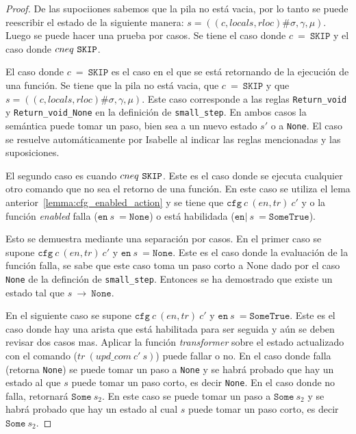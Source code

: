 \begin{proof}
De las supociiones sabemos que la pila no está vacia, por lo tanto se puede reescribir el estado de la siguiente manera: $s = ((c, locals, rloc)\#\sigma,\gamma,\mu)$.
Luego se puede hacer una prueba por casos.
Se tiene el caso donde $c\ =\ \mathtt{SKIP}$ y el caso donde $c\\neq\ \mathtt{SKIP}$.

El caso donde $c\ =\ \mathtt{SKIP}$ es el caso en el que se está retornando de la ejecución de una función.
Se tiene que la pila no está vacia, que $c\ =\ \mathtt{SKIP}$ y que $s = ((c, locals, rloc)\#\sigma,\gamma,\mu)$.
Este caso corresponde a las reglas \verb|Return_void| y \verb|Return_void_None| en la definición de \verb|small_step|.
En ambos casos la semántica puede tomar un paso, bien sea a un nuevo estado $s'$ o a \verb|None|.
El caso se resuelve automáticamente por Isabelle al indicar las reglas mencionadas y las suposiciones.

El segundo caso es cuando $c\\neq\ \mathtt{SKIP}$.
Este es el caso donde se ejecuta cualquier otro comando que no sea el retorno de una función.
En este caso se utiliza el lema anterior~\ref{lemma:cfg_enabled_action} y se tiene que $\mathtt{cfg}\ c\ (en,tr)\ c'$ y o la función \textit{enabled} falla ($\mathtt{en}\ s\ = \mathtt{None}$) o está habilidada ($\mathtt{en}|\ s\ = \mathtt{Some True}$).

Esto se demuestra mediante una separación por casos.
En el primer caso se supone $\mathtt{cfg}\ c\ (en,tr)\ c'$ y $\mathtt{en}\ s\ = \mathtt{None}$.
Este es el caso donde la evaluación de la función falla, se sabe que este caso toma un paso corto a None dado por el caso \verb|None| de la definción de \verb|small_step|.
Entonces se ha demostrado que existe un estado tal que $s\ \rightarrow\ \mathtt{None}$.

En el siguiente caso se supone $\mathtt{cfg}\ c\ (en,tr)\ c'$ y $\mathtt{en}\ s\ = \mathtt{Some True}$.
Este es el caso donde hay una arista que está habilitada para ser seguida y aún se deben revisar dos casos mas.
Aplicar la función \textit{transformer} sobre el estado actualizado con el comando ($tr\ (upd\_com\ c'\ s)$) puede fallar o no.
En el caso donde falla (retorna \verb|None|) se puede tomar un paso a \verb|None| y se habrá probado que hay un estado al que $s$ puede tomar un paso corto, es decir \verb|None|.
En el caso donde no falla, retornará $\mathtt{Some}\ s_{2}$.
En este caso se puede tomar un paso a $\mathtt{Some}\ s_{2}$ y se habrá probado que hay un estado al cual $s$ puede tomar un paso corto, es decir $\mathtt{Some}\ s_{2}$.
\end{proof}


